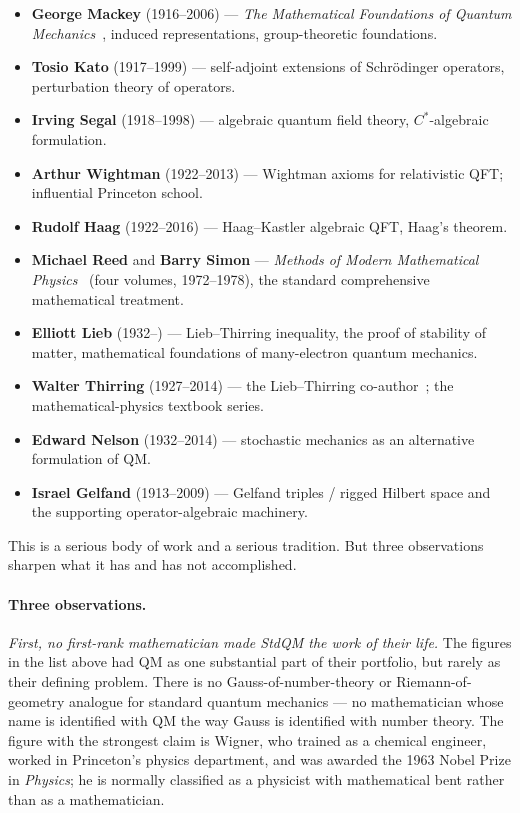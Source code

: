 \begin{itemize}
\item \textbf{George Mackey} (1916--2006) --- \emph{The Mathematical Foundations of Quantum Mechanics}~\cite{Mackey1963}, induced representations, group-theoretic foundations.
\item \textbf{Tosio Kato} (1917--1999) --- self-adjoint extensions of Schr\"odinger operators, perturbation theory of operators.
\item \textbf{Irving Segal} (1918--1998) --- algebraic quantum field theory, $C^*$-algebraic formulation.
\item \textbf{Arthur Wightman} (1922--2013) --- Wightman axioms for relativistic QFT; influential Princeton school.
\item \textbf{Rudolf Haag} (1922--2016) --- Haag--Kastler algebraic QFT, Haag's theorem.
\item \textbf{Michael Reed} and \textbf{Barry Simon} --- \emph{Methods of Modern Mathematical Physics}~\cite{ReedSimon} (four volumes, 1972--1978), the standard comprehensive mathematical treatment.
\item \textbf{Elliott Lieb} (1932--) --- Lieb--Thirring inequality, the proof of stability of matter, mathematical foundations of many-electron quantum mechanics.
\item \textbf{Walter Thirring} (1927--2014) --- the Lieb--Thirring co-author~\cite{LiebThirring1975}; the mathematical-physics textbook series.
\item \textbf{Edward Nelson} (1932--2014) --- stochastic mechanics as an alternative formulation of QM.
\item \textbf{Israel Gelfand} (1913--2009) --- Gelfand triples / rigged Hilbert space and the supporting operator-algebraic machinery.
\end{itemize}

This is a serious body of work and a serious tradition. But three observations sharpen what it has and has not accomplished.

\paragraph{Three observations.}

\emph{First, no first-rank mathematician made StdQM the work of their life.} The figures in the list above had QM as one substantial part of their portfolio, but rarely as their defining problem. There is no Gauss-of-number-theory or Riemann-of-geometry analogue for standard quantum mechanics --- no mathematician whose name is identified with QM the way Gauss is identified with number theory. The figure with the strongest claim is Wigner, who trained as a chemical engineer, worked in Princeton's physics department, and was awarded the 1963 Nobel Prize in \emph{Physics}; he is normally classified as a physicist with mathematical bent rather than as a mathematician.

